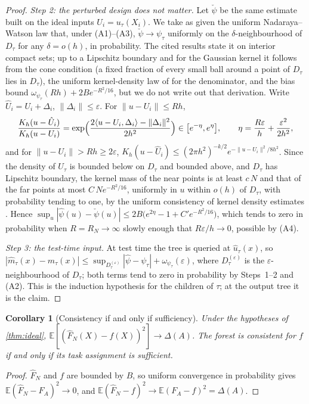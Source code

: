 \documentclass[11pt]{article}
\newtheorem{corollary}[theorem]{Corollary}
\theoremstyle{definition}
\theoremstyle{remark}
\newcommand{\E}{\mathbb{E}}
\begin{document}
\begin{proof}
\emph{Step 2: the perturbed design does not matter.}  Let $\check\psi$ be the same
estimate built on the ideal inputs $U_i=u_\tau(X_i)$.  We take as given the uniform Nadaraya--Watson law that, under (A1)--(A3),
$\check\psi\to\psi_\tau$ uniformly on the $\delta$-neighbourhood of $D_\tau$ for any
$\delta=o(h)$, in probability.  The cited results \citep{devroye1978,mack1982} state it on
interior compact sets; up to a Lipschitz boundary and for the Gaussian kernel it follows from
the cone condition (a fixed fraction of every small ball around a point of $D_\tau$ lies in
$D_\tau$), the uniform kernel-density law of \citet{einmahl2005} for the denominator, and the
bias bound $\omega_{\psi_\tau}(Rh)+2Be^{-R^2/16}$, but we do not write out that derivation.  Write $\hat U_i=U_i+\Delta_i$, $\|\Delta_i\|\le\varepsilon$.
For $\|u-U_i\|\le Rh$,
\[
  \frac{K_h(u-\hat U_i)}{K_h(u-U_i)}=\exp\Bigl(\frac{2\langle u-U_i,\Delta_i\rangle-\|\Delta_i\|^2}{2h^2}\Bigr)
  \in\bigl[e^{-\eta},e^{\eta}\bigr],\qquad \eta=\frac{R\varepsilon}{h}+\frac{\varepsilon^2}{2h^2},
\]
and for $\|u-U_i\|>Rh\ge2\varepsilon$, $K_h(u-\hat U_i)\le(2\pi h^2)^{-k/2}
e^{-\|u-U_i\|^2/8h^2}$.  Since the density of $U_\tau$ is bounded below on $D_\tau$ and
bounded above, and $D_\tau$ has Lipschitz boundary, the kernel mass of the near points
is at least $c\,N$ and that of the far points at most $C\,Ne^{-R^2/16}$, uniformly in $u$
within $o(h)$ of $D_\tau$, with probability tending to one, by the uniform consistency
of kernel density estimates \citep{einmahl2005}.
Hence $\sup_u|\hat\psi(u)-\check\psi(u)|\le2B\bigl(e^{2\eta}-1+C'e^{-R^2/16}\bigr)$, which
tends to zero in probability when $R=R_N\to\infty$ slowly enough that
$R\varepsilon/h\to0$, possible by (A4).

\emph{Step 3: the test-time input.}  At test time the tree is queried at $\hat u_\tau(x)$,
so $|\hat m_\tau(x)-m_\tau(x)|\le\sup_{D_\tau^{(\varepsilon)}}|\hat\psi-\psi_\tau|+
\omega_{\psi_\tau}(\varepsilon)$, where $D_\tau^{(\varepsilon)}$ is the
$\varepsilon$-neighbourhood of $D_\tau$; both terms tend to zero in probability by
Steps~1--2 and (A2).  This is the induction hypothesis for the children of $\tau$; at
the output tree it is the claim.
\end{proof}

\begin{corollary}[Consistency if and only if sufficiency]\label{cor:iff}
Under the hypotheses of \cref{thm:ideal}, $\E[(\hat F_N(X)-f(X))^2]\to\Delta(A)$.  The
forest is consistent for $f$ if and only if its task assignment is sufficient.
\end{corollary}
\begin{proof}
$\hat F_N$ and $f$ are bounded by $B$, so uniform convergence in probability gives
$\E(\hat F_N-F_A)^2\to0$, and $\E(\hat F_N-f)^2\to\E(F_A-f)^2=\Delta(A)$.
\end{proof}
\end{document}
